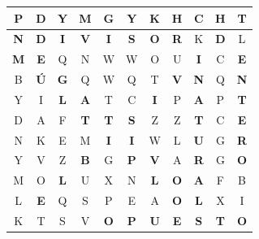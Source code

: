 \documentclass[addpoints,spanish, 12pt,a4paper]{exam}
\begin{document}
\begin{questions}
\begin{solution}   
\begin{tabular}{|c|c|c|c|c|c|c|c|c|c|c|}
\hline
P & D & Y & M & G & Y & K & H & C & H & T \\ \hline
\textbf{N} & \textbf{D} & \textbf{I} & \textbf{V} & \textbf{I} & \textbf{S} & \textbf{O} & \textbf{R} & K & \textbf{D} & L \\ \hline
\textbf{M} & \textbf{E} & Q & N & W & W & O & U & \textbf{I} & C & \textbf{E} \\ \hline
B & \textbf{Ú} & \textbf{G} & Q & W & Q & T & \textbf{V} & \textbf{N} & Q & \textbf{N} \\ \hline
Y & I & \textbf{L} & \textbf{A} & T & C & \textbf{I} & P & \textbf{A} & P & \textbf{T} \\ \hline
D & A & F & \textbf{T} & \textbf{T} & \textbf{S} & Z & Z & \textbf{T} & C & \textbf{E} \\ \hline
N & K & E & M & \textbf{I} & \textbf{I} & W & L & \textbf{U} & G & \textbf{R} \\ \hline
Y & V & Z & \textbf{B} & G & \textbf{P} & \textbf{V} & A & \textbf{R} & G & \textbf{O} \\ \hline
M & O & \textbf{L} & U & X & N & \textbf{L} & \textbf{O} & \textbf{A} & F & B \\ \hline
L & \textbf{E} & Q & S & P & E & A & \textbf{O} & \textbf{L} & X & I \\ \hline
K & T & S & V & \textbf{O} & \textbf{P} & \textbf{U} & \textbf{E} & \textbf{S} & \textbf{T} & \textbf{O} \\ \hline
\end{tabular}\end{solution}


\end{questions}
\end{document}
